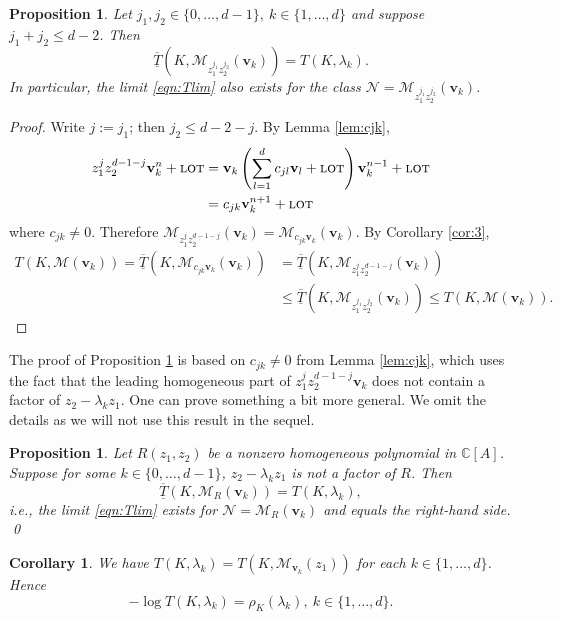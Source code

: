 \documentclass[12pt]{article}
\numberwithin{equation}{section}
\newtheorem{proposition}[theorem]{Proposition}
\newtheorem{corollary}[theorem]{Corollary}
\newcommand{\C}{\mathbb{C}}
\newcommand{\calM}{\mathcal{M}}
\newcommand{\lot}{\text{\sc lot}}
\newcommand{\calN}{\mathcal{N}}
\newcommand{\bv}{\mathbf{v}}
\begin{document}
\begin{proposition}\label{prop:Tz1z2}
Let $j_1,j_2\in \{0,\ldots,d-1\}, \ k \in \{1,\ldots,d\}$ and suppose $j_1+j_2\leq d-2$.  Then 
$$
\overline{\underline T}(K,\calM_{z_1^{j_1}z_2^{j_2}}(\bv_k)) = T(K,\lambda_k).
$$
In particular, the limit \eqref{eqn:Tlim} also exists for the class $\calN =\calM_{z_1^{j_1}z_2^{j_2}}(\bv_k)$.  
\end{proposition}

\begin{proof}
Write  $j:=j_1$; then $j_2\leq d-2-j$.  By Lemma \ref{lem:cjk}, 
$$\begin{aligned}
z_1^{j}z_2^{d-1-j}\bv_k^n + \lot &= \bv_k\left(\sum_{l=1}^{d} c_{jl}\bv_l +\lot\right)\bv_k^{n-1} +\lot \\
& = c_{jk}\bv_k^{n+1}+\lot
\end{aligned}$$
where $c_{jk}\neq 0$.  Therefore $\calM_{z_1^{j}z_2^{d-1-j}}(\bv_k) = \calM_{c_{jk}\bv_k}(\bv_k)$. By Corollary \ref{cor:3},  
$$\begin{aligned}
T(K,\calM(\bv_k)) =\overline{\underline T}(K,\calM_{c_{jk}\bv_k}(\bv_k)) 
&=\overline{\underline T}(K,\calM_{z_1^{j}z_2^{d-1-j}}(\bv_k))  \\
& \leq \overline{\underline T}(K,\calM_{z_1^{j_1}z_2^{j_2}}(\bv_k)) \leq  T(K,\calM(\bv_k)).
\end{aligned}$$
\end{proof}

The proof of Proposition \ref{prop:Tz1z2} is based on $c_{jk}\neq 0$ from Lemma \ref{lem:cjk}, which uses the fact that the leading homogeneous part of  $z_1^{j}z_2^{d-1-j}\bv_k$ does not contain a factor of $z_2-\lambda_k z_1$.  One can prove something a bit more general. We omit the details as we will not use this result in the sequel. 
\begin{proposition}
Let $R(z_1,z_2)$ be a nonzero homogeneous polynomial in $\C[A]$.  Suppose  for some $k\in\{0,\ldots,d-1\}$, $z_2-\lambda_k z_1$ is not a factor of $R$.  Then 
$$
\overline{\underline T}(K,\calM_R(\bv_k))=T(K,\lambda_k),
$$
i.e., the limit \eqref{eqn:Tlim} exists for $\calN =\calM_{R}(\bv_k)$ and equals the right-hand side.  \qed
\end{proposition}


\begin{corollary}\label{cor:oldT}
We have $T(K,\lambda_k)=T(K,\calM_{\bv_k}(z_1))$ for each $k\in\{1,\ldots,d\}$. Hence 
$$-\log T(K,\lambda_k)=\rho_K(\lambda_k), \ k\in\{1,\ldots,d\}.$$
\end{corollary}
\end{document}
